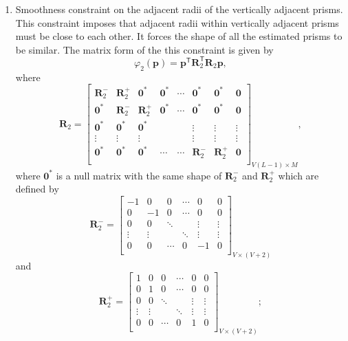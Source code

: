 \begin{enumerate}
\item Smoothness constraint on the adjacent radii of the vertically adjacent prisms. This constraint imposes that adjacent radii within vertically adjacent prisms must be close to each other. It forces the shape of all the estimated prisms to be similar. The matrix form of the this constraint is given by
\begin{equation}
\varphi_{2}(\mathbf{p}) = \mathbf{p}^\mathsf{T}\mathbf{R}^\mathsf{T}_{2}\mathbf{R}_{2}\mathbf{p} ,
\end{equation}
where
\begin{equation}
\mathbf{R}_{2} = 
\begin{bmatrix}
\mathbf{R}^{-}_{2} & \mathbf{R}^{+}_{2} & \mathbf{0}^{*} & \mathbf{0}^{*} & \cdots & \mathbf{0}^{*} & \mathbf{0}^{*} & \mathbf{0}\\
\mathbf{0}^{*} & \mathbf{R}^{-}_{2} & \mathbf{R}^{+}_{2} & \mathbf{0}^{*} & \cdots & \mathbf{0}^{*} & \mathbf{0}^{*} & \mathbf{0}\\
\mathbf{0}^{*} & \mathbf{0}^{*} & \mathbf{0}^{*} &  &  & \vdots & \vdots & \vdots\\
\vdots & \vdots & \vdots &  &  & \vdots & \vdots & \vdots\\
\mathbf{0}^{*} & \mathbf{0}^{*} & \mathbf{0}^{*} & \cdots & \cdots & \mathbf{R}^{-}_{2} & \mathbf{R}^{+}_{2} & \mathbf{0}\\
\end{bmatrix}_{V(L-1)\times M},
\end{equation}
where $\mathbf{0}^{*}$ is a null matrix with the same shape of $\mathbf{R}^{-}_2$ and $\mathbf{R}^{+}_2$ which are defined by 
\begin{equation}
\mathbf{R}^{-}_{2} = 
\begin{bmatrix}
-1 & 0 & 0 & \cdots & 0 & 0 \\
0 & -1 & 0 & \cdots & 0 & 0 \\
0 & 0 & \ddots &  & \vdots & \vdots \\
\vdots & \vdots  &  & \ddots & \vdots & \vdots\\
0 & 0 & \cdots & 0 & -1 & 0 \\
\end{bmatrix}_{V\times (V+2)}
\end{equation}
and
\begin{equation}
\mathbf{R}^{+}_{2} = 
\begin{bmatrix}
1 & 0 & 0 & \cdots & 0 & 0 \\
0 & 1 & 0 & \cdots & 0 & 0 \\
0 & 0 & \ddots &  & \vdots & \vdots \\
\vdots & \vdots  &  & \ddots & \vdots & \vdots\\
0 & 0 & \cdots & 0 & 1 & 0 \\
\end{bmatrix}_{V\times (V+2)};
\end{equation}


\end{enumerate}
